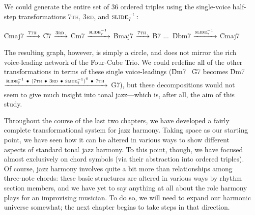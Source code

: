 We could generate the entire set of 36 ordered triples
using the single-voice half-step transformations \textsc{7th}, \textsc{3rd},
and $\text{\textsc{slide}}_7^{-1}$:%
%
\begin{center}
  \h{Cmaj7} $\xrightarrow{\text{7\textsc{th}}\,}$
  \h{C7}  $\xrightarrow{\text{3\textsc{rd}}\,}$
  \h{Cm7} $\xrightarrow{\text{\textsc{slide}}_7^{-1}\,}$
  \h{Bmaj7} $\xrightarrow{\text{7\textsc{th}}\,}$
  \h{B7}  $\ldots\ $
  \h{Dbm7} $\xrightarrow{\text{\textsc{slide}}_7^{-1}\,}$
  \h{Cmaj7}
\end{center}%
%
The resulting graph, however, is simply a circle, and does not mirror the rich
voice-leading network of the Four-Cube Trio. We could redefine all of the
other transformations in terms of these single voice-leadings (\h{Dm7}
\TFarrow\ \h{G7} becomes \h{Dm7}
$\xrightarrow{\text{\textsc{slide}}_7^{-1}\ \bullet\ {(\text{7\textsc{th}}\ \bullet\
  \text{3\textsc{rd}}\ \bullet\ \text{\textsc{slide}}_7^{-1})}^6\ \bullet\
  7\text{\textsc{th}}\,}$
\h{G7}), but these decompositions would not seem to give much insight into
tonal jazz---which is, after all, the aim of this study.

Throughout the course of the last two chapters, we have developed a fairly
complete transformational system for jazz harmony. Taking \tf space as our
starting point, we have seen how it can be altered in various ways to show
different aspects of standard tonal jazz harmony. To this point, though, we
have focused almost exclusively on chord symbols (via their abstraction into
ordered triples). Of course, jazz harmony involves quite a bit more than
relationships among three-note chords: these basic structures are altered in
various ways by rhythm section members, and we have yet to say anything at all
about the role harmony plays for an improvising musician. To do so, we will need
to expand our harmonic universe somewhat; the next chapter begins to take
steps in that direction.


